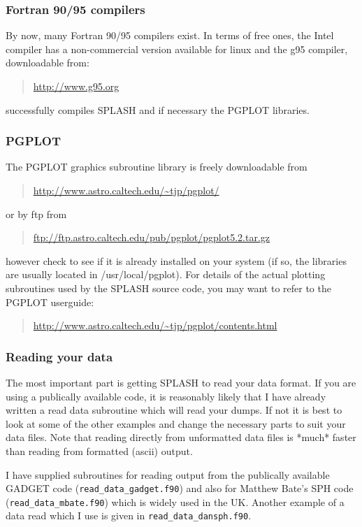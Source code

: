 \documentclass[a4paper,11pt]{article}
\begin{document}
\subsubsection{Fortran 90/95 compilers}
 By now, many Fortran 90/95 compilers exist. In terms of free ones, the Intel compiler has a
 non-commercial version available for linux and the
g95 compiler, downloadable from:
\begin{quote}
\url{http://www.g95.org}
\end{quote}
successfully compiles SPLASH and if necessary the PGPLOT libraries.

\subsubsection{PGPLOT}
 The PGPLOT
graphics subroutine library is freely downloadable from
\begin{quote}
\url{http://www.astro.caltech.edu/~tjp/pgplot/}
\end{quote}
or by ftp from
\begin{quote}
\url{ftp://ftp.astro.caltech.edu/pub/pgplot/pgplot5.2.tar.gz}
\end{quote}
however check to see if it is already installed on your system (if so, the libraries are
usually located in /usr/local/pgplot). For details of the actual plotting subroutines
used by the SPLASH source code, you may want to refer to the PGPLOT userguide:
\begin{quote}
\url{http://www.astro.caltech.edu/~tjp/pgplot/contents.html}
\end{quote}

\subsubsection{Reading your data}
 The most important part is getting SPLASH to read your data format.
If you are using a publically available code, it is reasonably likely that I
have already written a read data subroutine which will read your dumps.
If not it is best to look at some of the other examples and change the 
necessary parts to suit your data files. Note that reading directly from
unformatted data files is *much* faster than reading from formatted (ascii)
output.   

I have supplied subroutines for reading output from the publically available
GADGET code (\verb+read_data_gadget.f90+) and also for Matthew Bate's SPH code
(\verb+read_data_mbate.f90+) which is widely used in the UK. Another example of a
data read which I use is given in \verb+read_data_dansph.f90+.
\end{document}
